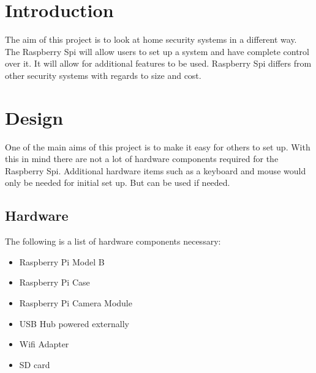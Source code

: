 \documentclass[]{report}   %
\begin{document}



\tableofcontents
\chapter {Introduction}
\label {ch:intro} 
The aim of this project is to look at home security systems in a different way. The Raspberry Spi will allow users to set up a system and have complete control over it. It will allow for additional features to be used. 
Raspberry Spi differs from other security systems with regards to size and cost. 
% 
% 
\chapter {Design}
\label {ch:design}
	One of the main aims of this project is to make it easy for others to set up. With this in mind there are not a lot of hardware components required for the Raspberry Spi. Additional hardware items such as a keyboard and mouse would only be needed for initial set up. But can be used if needed. \\
	
\section {Hardware}	
\label {sec:hardware}

The following is a list of hardware components necessary:\\
\begin {itemize}
  \item Raspberry Pi Model B
  \item Raspberry Pi Case
  \item Raspberry Pi Camera Module
  \item USB Hub powered externally
  \item Wifi Adapter
  \item SD card
\end {itemize} 
\end{document}
